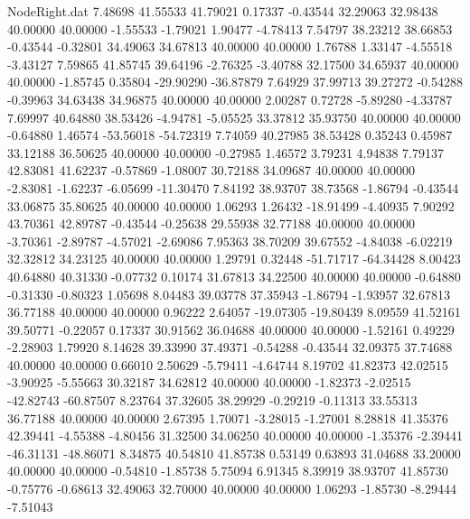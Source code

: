 \begin{filecontents}{NodeRight.dat}
   7.48698   41.55533   41.79021     0.17337   -0.43544   32.29063   32.98438   40.00000   40.00000   -1.55533   -1.79021    1.90477   -4.78413
   7.54797   38.23212   38.66853    -0.43544   -0.32801   34.49063   34.67813   40.00000   40.00000    1.76788    1.33147   -4.55518   -3.43127
   7.59865   41.85745   39.64196    -2.76325   -3.40788   32.17500   34.65937   40.00000   40.00000   -1.85745    0.35804  -29.90290  -36.87879
   7.64929   37.99713   39.27272    -0.54288   -0.39963   34.63438   34.96875   40.00000   40.00000    2.00287    0.72728   -5.89280   -4.33787
   7.69997   40.64880   38.53426    -4.94781   -5.05525   33.37812   35.93750   40.00000   40.00000   -0.64880    1.46574  -53.56018  -54.72319
   7.74059   40.27985   38.53428     0.35243    0.45987   33.12188   36.50625   40.00000   40.00000   -0.27985    1.46572    3.79231    4.94838
   7.79137   42.83081   41.62237    -0.57869   -1.08007   30.72188   34.09687   40.00000   40.00000   -2.83081   -1.62237   -6.05699  -11.30470
   7.84192   38.93707   38.73568    -1.86794   -0.43544   33.06875   35.80625   40.00000   40.00000    1.06293    1.26432  -18.91499   -4.40935
   7.90292   43.70361   42.89787    -0.43544   -0.25638   29.55938   32.77188   40.00000   40.00000   -3.70361   -2.89787   -4.57021   -2.69086
   7.95363   38.70209   39.67552    -4.84038   -6.02219   32.32812   34.23125   40.00000   40.00000    1.29791    0.32448  -51.71717  -64.34428
   8.00423   40.64880   40.31330    -0.07732    0.10174   31.67813   34.22500   40.00000   40.00000   -0.64880   -0.31330   -0.80323    1.05698
   8.04483   39.03778   37.35943    -1.86794   -1.93957   32.67813   36.77188   40.00000   40.00000    0.96222    2.64057  -19.07305  -19.80439
   8.09559   41.52161   39.50771    -0.22057    0.17337   30.91562   36.04688   40.00000   40.00000   -1.52161    0.49229   -2.28903    1.79920
   8.14628   39.33990   37.49371    -0.54288   -0.43544   32.09375   37.74688   40.00000   40.00000    0.66010    2.50629   -5.79411   -4.64744
   8.19702   41.82373   42.02515    -3.90925   -5.55663   30.32187   34.62812   40.00000   40.00000   -1.82373   -2.02515  -42.82743  -60.87507
   8.23764   37.32605   38.29929    -0.29219   -0.11313   33.55313   36.77188   40.00000   40.00000    2.67395    1.70071   -3.28015   -1.27001
   8.28818   41.35376   42.39441    -4.55388   -4.80456   31.32500   34.06250   40.00000   40.00000   -1.35376   -2.39441  -46.31131  -48.86071
   8.34875   40.54810   41.85738     0.53149    0.63893   31.04688   33.20000   40.00000   40.00000   -0.54810   -1.85738    5.75094    6.91345
   8.39919   38.93707   41.85730    -0.75776   -0.68613   32.49063   32.70000   40.00000   40.00000    1.06293   -1.85730   -8.29444   -7.51043

\end{filecontents}
